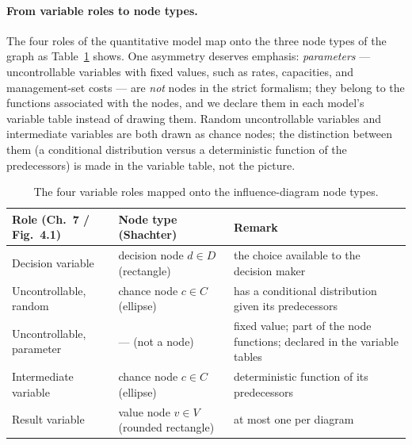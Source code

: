 \paragraph{From variable roles to node types.}
The four roles of the quantitative model map onto the three node types of the graph as Table~\ref{tab:rolemap} shows. One asymmetry deserves emphasis: \emph{parameters} --- uncontrollable variables with fixed values, such as rates, capacities, and management-set costs --- are \emph{not} nodes in the strict formalism; they belong to the functions associated with the nodes, and we declare them in each model's variable table instead of drawing them. Random uncontrollable variables and intermediate variables are both drawn as chance nodes; the distinction between them (a conditional distribution versus a deterministic function of the predecessors) is made in the variable table, not the picture.

\begin{table}[H]
\centering
\caption{The four variable roles mapped onto the influence-diagram node types.}
\label{tab:rolemap}
\begin{tabularx}{\textwidth}{@{}l l X@{}}
\toprule
\textbf{Role (Ch.~7 / Fig.~4.1)} & \textbf{Node type (Shachter)} & \textbf{Remark} \\
\midrule
Decision variable & decision node $d \in D$ (rectangle) & the choice available to the decision maker \\
Uncontrollable, random & chance node $c \in C$ (ellipse) & has a conditional distribution given its predecessors \\
Uncontrollable, parameter & --- (not a node) & fixed value; part of the node functions; declared in the variable tables \\
Intermediate variable & chance node $c \in C$ (ellipse) & deterministic function of its predecessors \\
Result variable & value node $v \in V$ (rounded rectangle) & at most one per diagram \\
\bottomrule
\end{tabularx}
\end{table}

